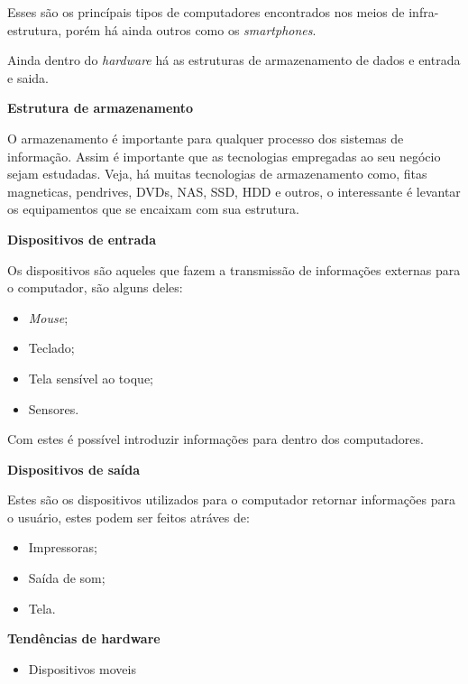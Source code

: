 \documentclass[
	12pt,				%
	openany,			%
	a4paper,			%
	chapter=TITLE,		%
	section=TITLE,		%
	english,
	brazil				%
]{abntex2}
\begin{document}
\begin{itemize}
\begin{itemize}
\begin{itemize}
	Esses são os princípais tipos de computadores encontrados nos meios de infra-estrutura, porém há ainda outros como os \textit{smartphones}.

	Ainda dentro do \textit{hardware} há as estruturas de armazenamento de dados e entrada e saida.

	\textbf{Estrutura de armazenamento}

	O armazenamento é importante para qualquer processo dos sistemas de informação. Assim é importante que as tecnologias empregadas ao seu negócio sejam estudadas. Veja, há muitas tecnologias de armazenamento como, fitas magneticas, pendrives, DVDs, NAS, SSD, HDD e outros, o interessante é levantar os equipamentos que se encaixam com sua estrutura.

	\textbf{Dispositivos de entrada}

	Os dispositivos são aqueles que fazem a transmissão de informações externas para o computador, são alguns deles:

	\begin{itemize}
		\item \textit{Mouse};
		\item Teclado;
		\item Tela sensível ao toque;
		\item Sensores.
	\end{itemize}
	Com estes é possível introduzir informações para dentro dos computadores.

	\textbf{Dispositivos de saída}

	Estes são os dispositivos utilizados para o computador retornar informações para o usuário, estes podem ser feitos atráves de:
	\begin{itemize}
		\item Impressoras;
		\item Saída de som;
		\item Tela.
	\end{itemize}

	\textbf{Tendências de hardware}
		\begin{itemize}
			\item Dispositivos moveis
		\end{itemize}


\end{itemize}
\end{itemize}
\end{itemize}
\end{document}
